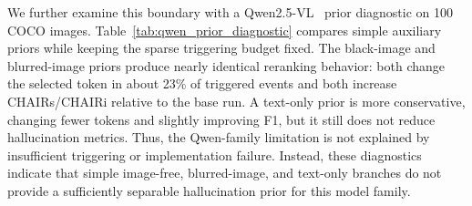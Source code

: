 \documentclass[11pt]{article}
\begin{document}
\begin{table}[h]
  \centering
  \small
  \setlength{\tabcolsep}{4.0pt}
  \caption{
  Qwen-family boundary diagnostics on 500 COCO images.
  The runs show that successful triggering and accepted local changes do not guarantee robust aggregate improvement when the correction signal is not well aligned with the target model family.
  }
  \label{tab:appendix_qwen_boundary}
\end{table}

We further examine this boundary with a Qwen2.5-VL~\citep{qwen25vl2025technicalreport} prior diagnostic on 100 COCO images.
Table~\ref{tab:qwen_prior_diagnostic} compares simple auxiliary priors while keeping the sparse triggering budget fixed.
The black-image and blurred-image priors produce nearly identical reranking behavior: both change the selected token in about 23\% of triggered events and both increase CHAIRs/CHAIRi relative to the base run.
A text-only prior is more conservative, changing fewer tokens and slightly improving F1, but it still does not reduce hallucination metrics.
Thus, the Qwen-family limitation is not explained by insufficient triggering or implementation failure.
Instead, these diagnostics indicate that simple image-free, blurred-image, and text-only branches do not provide a sufficiently separable hallucination prior for this model family.
\end{document}

